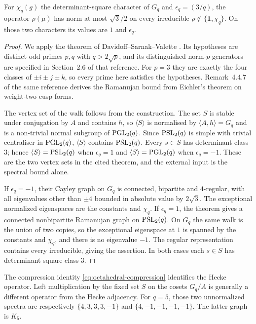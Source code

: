 \begin{proposition}
\label{prop:octahedral-arithmetic}
For $\chi_q(g)$ the determinant-square character of $G_q$ and
$\epsilon_q=(3/q)$, the operator $\rho(\mu)$ has norm at most
$\sqrt3/2$ on every irreducible $\rho\notin\{\mathbf1,\chi_q\}$.
On those two characters its values are $1$ and $\epsilon_q$.
\end{proposition}
\begin{proof}
We apply the theorem of Davidoff--Sarnak--Valette
\cite[Theorem 4.2.2]{DSV2003}. Its hypotheses are distinct odd primes
$p,q$ with $q>2\sqrt p$, and its distinguished norm-$p$ generators
are specified in Section~2.6 of that reference. For $p=3$ they are
exactly the four classes of $\pm i\pm j\pm k$, so every prime here
satisfies the hypotheses. Remark~4.4.7 of the same reference derives the
Ramanujan bound from Eichler's theorem on weight-two cusp forms.

The vertex set of the walk follows from the construction. The set $S$ is
stable under conjugation by $A$ and contains $h$, so $\langle S\rangle$ is
normalised by $\langle A,h\rangle=G_q$ and is a non-trivial normal subgroup
of $\operatorname{PGL}_2(q)$. Since $\operatorname{PSL}_2(q)$ is simple with trivial centraliser in
$\operatorname{PGL}_2(q)$, $\langle S\rangle$ contains $\operatorname{PSL}_2(q)$. Every $s\in S$ has
determinant class $3$; hence $\langle S\rangle=\operatorname{PSL}_2(q)$ when
$\epsilon_q=1$ and $\langle S\rangle=\operatorname{PGL}_2(q)$ when $\epsilon_q=-1$. These
are the two vertex sets in the cited theorem, and the external input is
the spectral bound alone.

If $\epsilon_q=-1$, their Cayley graph on $G_q$ is connected,
bipartite and $4$-regular, with all eigenvalues other than $\pm4$
bounded in absolute value by $2\sqrt3$. The exceptional normalized
eigenspaces are the constants and $\chi_q$.
If $\epsilon_q=1$, the theorem gives a connected nonbipartite
Ramanujan graph on $\operatorname{PSL}_2(q)$. On $G_q$ the same walk is the union
of two copies, so the exceptional eigenspace at $1$ is spanned by
the constants and $\chi_q$, and there is no eigenvalue $-1$.
The regular representation contains every irreducible, giving the
assertion. In both cases each $s\in S$ has determinant square class $3$.
\end{proof}

The compression identity \eqref{eq:octahedral-compression} identifies the
Hecke operator. Left multiplication
by the fixed set $S$ on the cosets $G_q/A$ is generally a different
operator from the Hecke adjacency. For $q=5$, those two unnormalized
spectra are respectively $\{4,3,3,3,-1\}$ and
$\{4,-1,-1,-1,-1\}$. The latter graph is $K_5$.


